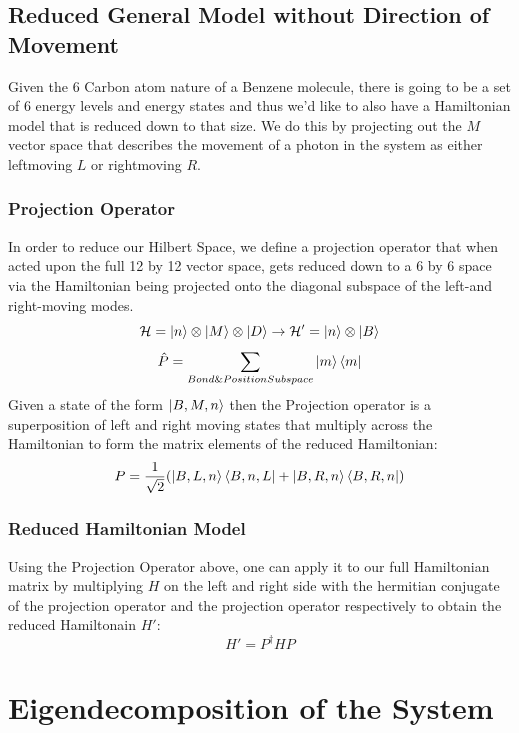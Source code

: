 \section{Reduced General Model without Direction of Movement}
Given the 6 Carbon atom nature of a Benzene molecule, there is going to be a set of 6 energy levels and energy states and thus we'd like to also have a Hamiltonian model that is reduced down to that size. We do this by projecting out the $M$ vector space that describes the movement of a photon in the system as either leftmoving $L$ or rightmoving $R$.
\subsection{Projection Operator}
In order to reduce our Hilbert Space, we define a projection operator that when acted upon the full 12 by 12 vector space, gets reduced down to a 6 by 6 space via the Hamiltonian being projected onto the diagonal subspace of the left-and right-moving modes. 
\begin{equation}
     \mathcal{H} = \ket{n} \otimes \ket{M} \otimes \ket{D} \rightarrow \mathcal{H'} = \ket{n} \otimes \ket{B}
\end{equation}
\begin{equation}
    \hat{P} = \sum_{Bond\&Position Subspace} \ket{m} \bra{m}
\end{equation}
Given a state of the form $\ket{B,M,n}$ then the Projection operator is a superposition of left and right moving states that multiply across the Hamiltonian to form the matrix elements of the reduced Hamiltonian: 
\begin{equation}
    P = \frac{1}{\sqrt{2}} (\ket{B,L,n}\bra{B,n,L} + \ket{B,R,n}\bra{B,R,n})
\end{equation}
\subsection{Reduced Hamiltonian Model}
Using the Projection Operator above, one can apply it to our full Hamiltonian matrix by multiplying $H$ on the left and right side with the hermitian conjugate of the projection operator and the projection operator respectively to obtain the reduced Hamiltonain $H'$:
\begin{equation}
    H' = P^{\dagger}HP
\end{equation}

\chapter{Eigendecomposition of the System}
